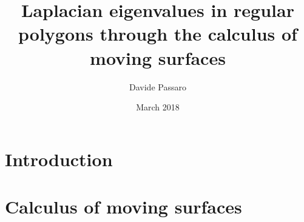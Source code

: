 \documentclass{article}
\title{Laplacian eigenvalues in regular polygons through the calculus of moving surfaces}
\author{Davide Passaro}
\date{March 2018}
\theoremstyle{plain}
\theoremstyle{definition}
\theoremstyle{remark}
\begin{document}
\maketitle

\section{Introduction}
    
\section{Calculus of moving surfaces}
    
    
\printbibliography
\end{document}
